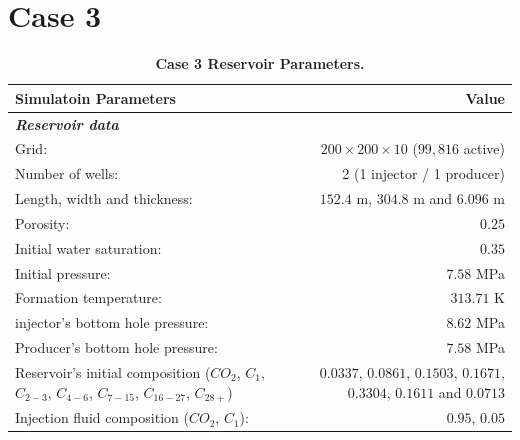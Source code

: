 \section{Case 3}

\FloatBarrier
\begin{center}
\begin{table}[h!]
\begin{adjustbox}{width=\textwidth}
    \begin{threeparttable}
    \caption{\textbf{Case 3 Reservoir Parameters\supercite{fernandes}.}}
    \label{case1}
        \begin{tabular}{l r }
            \toprule
            Simulatoin Parameters & Value\\
            \midrule
	\rowcolor{red!20}\textit{\textbf{Reservoir data}}      & \\
	Grid:      &           $200\times200\times10$ ($99,816$ active) \\
	\rowcolor{blue!5}Number of wells:      &  2 (1 injector / 1 producer) \\
	Length, width and thickness:      & $152.4$ m, $304.8$ m and $6.096$ m\\
	\rowcolor{blue!5}Porosity:       &          $0.25$ \\
	Initial water saturation:    & $0.35$ \\      
	\rowcolor{blue!5}Initial pressure:    &      $7.58$ MPa\\
	Formation temperature:    & $313.71$ K     \\
	injector's bottom hole pressure:    &       $8.62$ MPa \\
	\rowcolor{blue!5}Producer’s bottom hole pressure:    &       $7.58$ MPa\\
	Reservoir’s initial composition ($CO_{2}$, $C_{1}$, $C_{2-3}$, $C_{4-6}$, $C_{7-15}$, $C_{16-27}$, $C_{28+}$) & $0.0337$, $0.0861$, $0.1503$, $0.1671$, $0.3304$, $0.1611$ and $0.0713$\\
	\rowcolor{blue!5}Injection ﬂuid composition ($CO_{2}$, $C_{1}$):    &   $0.95$, $0.05$\\
        \bottomrule
        \end{tabular}
    \end{threeparttable}
\end{adjustbox}    
\end{table}
\end{center}
\FloatBarrier

